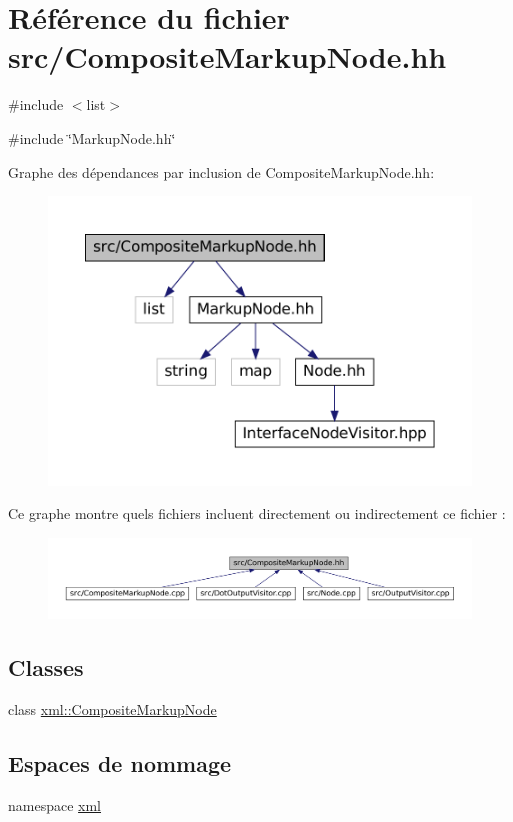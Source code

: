 \hypertarget{_composite_markup_node_8hh}{
\section{Référence du fichier src/CompositeMarkupNode.hh}
\label{_composite_markup_node_8hh}
}
{\ttfamily \#include $<$list$>$}\par
{\ttfamily \#include \char`\"{}MarkupNode.hh\char`\"{}}\par
Graphe des dépendances par inclusion de CompositeMarkupNode.hh:\nopagebreak
\begin{figure}[H]
\begin{center}
\leavevmode
\includegraphics[width=400pt]{_composite_markup_node_8hh__incl}
\end{center}
\end{figure}
Ce graphe montre quels fichiers incluent directement ou indirectement ce fichier :\nopagebreak
\begin{figure}[H]
\begin{center}
\leavevmode
\includegraphics[width=400pt]{_composite_markup_node_8hh__dep__incl}
\end{center}
\end{figure}
\subsection*{Classes}
\begin{DoxyCompactItemize}
\item 
class \hyperlink{classxml_1_1_composite_markup_node}{xml::CompositeMarkupNode}
\end{DoxyCompactItemize}
\subsection*{Espaces de nommage}
\begin{DoxyCompactItemize}
\item 
namespace \hyperlink{namespacexml}{xml}
\end{DoxyCompactItemize}
